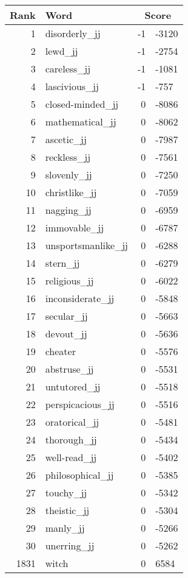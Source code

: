 \begin{longtable}[!htbp]{| rlr@{.}l |}
    \hline
    \textbf{Rank} & \textbf{Word} & \multicolumn{2}{c|}{\textbf{Score}} \\
    \hline
    \endhead
    1 & disorderly\_jj & -1 & -3120 \\
    2 & lewd\_jj & -1 & -2754 \\
    3 & careless\_jj & -1 & -1081 \\
    4 & lascivious\_jj & -1 & -757 \\
    5 & closed-minded\_jj & 0 & -8086 \\
    6 & mathematical\_jj & 0 & -8062 \\
    7 & ascetic\_jj & 0 & -7987 \\
    8 & reckless\_jj & 0 & -7561 \\
    9 & slovenly\_jj & 0 & -7250 \\
    10 & christlike\_jj & 0 & -7059 \\
    11 & nagging\_jj & 0 & -6959 \\
    12 & immovable\_jj & 0 & -6787 \\
    13 & unsportsmanlike\_jj & 0 & -6288 \\
    14 & stern\_jj & 0 & -6279 \\
    15 & religious\_jj & 0 & -6022 \\
    16 & inconsiderate\_jj & 0 & -5848 \\
    17 & secular\_jj & 0 & -5663 \\
    18 & devout\_jj & 0 & -5636 \\
    19 & cheater & 0 & -5576 \\
    20 & abstruse\_jj & 0 & -5531 \\
    21 & untutored\_jj & 0 & -5518 \\
    22 & perspicacious\_jj & 0 & -5516 \\
    23 & oratorical\_jj & 0 & -5481 \\
    24 & thorough\_jj & 0 & -5434 \\
    25 & well-read\_jj & 0 & -5402 \\
    26 & philosophical\_jj & 0 & -5385 \\
    27 & touchy\_jj & 0 & -5342 \\
    28 & theistic\_jj & 0 & -5304 \\
    29 & manly\_jj & 0 & -5266 \\
    30 & unerring\_jj & 0 & -5262 \\
    1831 & witch & 0 & 6584 \\

\end{longtable}
